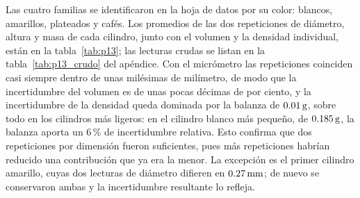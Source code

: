 Las cuatro familias se identificaron en la hoja de datos por su color: blancos, amarillos, plateados y cafés. Los promedios de las dos repeticiones de diámetro, altura y masa de cada cilindro, junto con el volumen y la densidad individual, están en la tabla~\ref{tab:p13}; las lecturas crudas se listan en la tabla~\ref{tab:p13_crudo} del apéndice. Con el micrómetro las repeticiones coinciden casi siempre dentro de unas milésimas de milímetro, de modo que la incertidumbre del volumen es de unas pocas décimas de por ciento, y la incertidumbre de la densidad queda dominada por la balanza de $0.01\,\mathrm{g}$, sobre todo en los cilindros más ligeros: en el cilindro blanco más pequeño, de $0.185\,\mathrm{g}$, la balanza aporta un $6\,\%$ de incertidumbre relativa. Esto confirma que dos repeticiones por dimensión fueron suficientes, pues más repeticiones habrían reducido una contribución que ya era la menor. La excepción es el primer cilindro amarillo, cuyas dos lecturas de diámetro difieren en $0.27\,\mathrm{mm}$; de nuevo se conservaron ambas y la incertidumbre resultante lo refleja.

